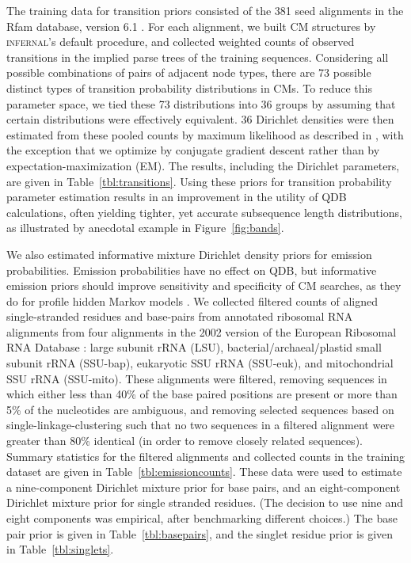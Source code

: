 \documentclass[11pt]{article}
\newif\ifdraft
\begin{document}
The training data for transition priors consisted of the 381 seed
alignments in the Rfam database, version 6.1
\cite{Griffiths-Jones05}. For each alignment, we built CM structures
by \textsc{infernal}'s default procedure, and collected weighted
counts of observed transitions in the implied parse trees of the
training sequences. Considering all possible combinations of pairs of
adjacent node types, there are 73 possible distinct types of
transition probability distributions in CMs. To reduce this parameter
space, we tied these 73 distributions into 36 groups by assuming that
certain distributions were effectively equivalent.  36 Dirichlet
densities were then estimated from these pooled counts by maximum
likelihood as described in \cite{Sjolander96}, with the exception that
we optimize by conjugate gradient descent \cite{Press93} rather than
by expectation-maximization (EM).  The results, including the
Dirichlet parameters, are given in Table~\ref{tbl:transitions}.  Using
these priors for transition probability parameter estimation results
in an improvement in the utility of QDB calculations, often yielding
tighter, yet accurate subsequence length distributions, as illustrated
by anecdotal example in Figure~\ref{fig:bands}.

\ifdraft

\fi

We also estimated informative mixture Dirichlet density priors for
emission probabilities.  Emission probabilities have no effect on QDB,
but informative emission priors should improve sensitivity and
specificity of CM searches, as they do for profile hidden Markov
models \cite{BrownM93,Sjolander96}. We collected filtered counts of
aligned single-stranded residues and base-pairs from annotated
ribosomal RNA alignments from four alignments in the 2002 version of
the European Ribosomal RNA Database \cite{Wuyts01, Wuyts02}: large
subunit rRNA (LSU), bacterial/archaeal/plastid small subunit rRNA
(SSU-bap), eukaryotic SSU rRNA (SSU-euk), and mitochondrial SSU rRNA
(SSU-mito). These alignments were filtered, removing sequences in
which either less than 40\% of the base paired positions are present
or more than 5\% of the nucleotides are ambiguous, and removing
selected sequences based on single-linkage-clustering such that no two
sequences in a filtered alignment were greater than 80\% identical (in
order to remove closely related sequences). Summary statistics for the
filtered alignments and collected counts in the training dataset are
given in Table~\ref{tbl:emissioncounts}. These data were used to
estimate a nine-component Dirichlet mixture prior for base pairs, and
an eight-component Dirichlet mixture prior for single stranded
residues. (The decision to use nine and eight components was
empirical, after benchmarking different choices.) The base pair prior
is given in Table~\ref{tbl:basepairs}, and the singlet residue prior
is given in Table~\ref{tbl:singlets}.
\end{document}
